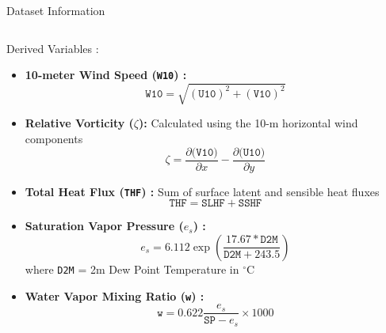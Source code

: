 \begin{frame}{Dataset Information}
\begin{columns}[T]
		\begin{block}{Derived Variables :}
			\begin{itemize}\footnotesize
				\item \textbf{10-meter Wind Speed (\texttt{W10}) :}
				      \footnotesize
				      \begin{equation}
					      \texttt{W10} = \sqrt{(\texttt{U10})^2 + (\texttt{V10})^2}
				      \end{equation}
				\item \textbf{Relative Vorticity (\texttt{$\zeta$}):} Calculated using the 10-m horizontal wind components
				      \footnotesize
				      \begin{equation}
					      \zeta = \frac{\partial(\texttt{V10)}}{\partial x} - \frac{\partial(\texttt{U10)}}{\partial y}
				      \end{equation}
				\item \textbf{Total Heat Flux (\texttt{THF}) :} Sum of surface latent and sensible heat fluxes
				      \footnotesize
				      \begin{equation}
					      \texttt{THF} = \texttt{SLHF} + \texttt{SSHF}
				      \end{equation}
				\item \textbf{Saturation Vapor Pressure (\texttt{$e_s$}) :}
				      \footnotesize
				      \begin{equation}
					      e_s = 6.112 \exp\left(\frac{17.67 * \texttt{D2M}}{\texttt{D2M} + 243.5}\right)
				      \end{equation}
				      where \texttt{D2M} = 2m Dew Point Temperature in $^\circ$C
				\item \textbf{Water Vapor Mixing Ratio (\texttt{w}) :}
				      \footnotesize
				      \begin{equation}
					      \texttt{w} = 0.622 \frac{e_s}{\texttt{SP} - e_s} \times 1000
				      \end{equation}
			\end{itemize}
		\end{block}
	\end{columns}
\end{frame}

